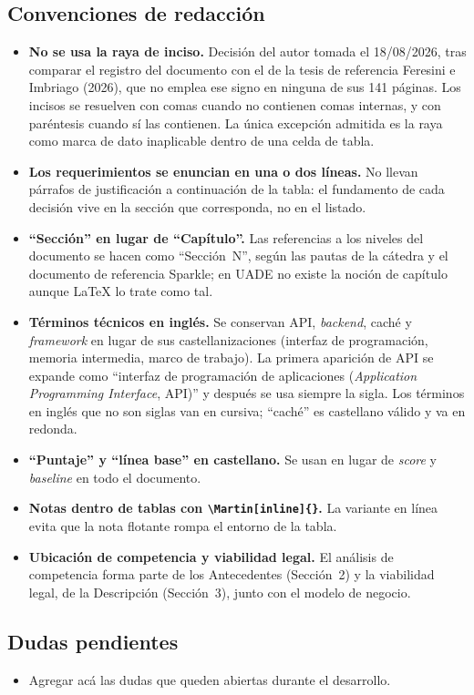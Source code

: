 \subsection*{Convenciones de redacción}
\begin{itemize}
    \item \textbf{No se usa la raya de inciso.} Decisión del autor tomada el 18/08/2026, tras comparar el registro del documento con el de la tesis de referencia Feresini e Imbriago (2026), que no emplea ese signo en ninguna de sus 141 páginas. Los incisos se resuelven con comas cuando no contienen comas internas, y con paréntesis cuando sí las contienen. La única excepción admitida es la raya como marca de dato inaplicable dentro de una celda de tabla.
    \item \textbf{Los requerimientos se enuncian en una o dos líneas.} No llevan párrafos de justificación a continuación de la tabla: el fundamento de cada decisión vive en la sección que corresponda, no en el listado.
    \item \textbf{\enquote{Sección} en lugar de \enquote{Capítulo}.} Las referencias a los niveles del documento se hacen como \enquote{Sección~N}, según las pautas de la cátedra y el documento de referencia Sparkle; en UADE no existe la noción de capítulo aunque \LaTeX{} lo trate como tal.
    \item \textbf{Términos técnicos en inglés.} Se conservan API, \emph{backend}, caché y \emph{framework} en lugar de sus castellanizaciones (interfaz de programación, memoria intermedia, marco de trabajo). La primera aparición de API se expande como \enquote{interfaz de programación de aplicaciones (\emph{Application Programming Interface}, API)} y después se usa siempre la sigla. Los términos en inglés que no son siglas van en cursiva; \enquote{caché} es castellano válido y va en redonda.
    \item \textbf{\enquote{Puntaje} y \enquote{línea base} en castellano.} Se usan en lugar de \emph{score} y \emph{baseline} en todo el documento.
    \item \textbf{Notas dentro de tablas con \texttt{\textbackslash Martin[inline]\{\}}.} La variante en línea evita que la nota flotante rompa el entorno de la tabla.
    \item \textbf{Ubicación de competencia y viabilidad legal.} El análisis de competencia forma parte de los Antecedentes (Sección~2) y la viabilidad legal, de la Descripción (Sección~3), junto con el modelo de negocio.
\end{itemize}

\subsection*{Dudas pendientes}
\begin{itemize}
    \item Agregar acá las dudas que queden abiertas durante el desarrollo.
\end{itemize}
